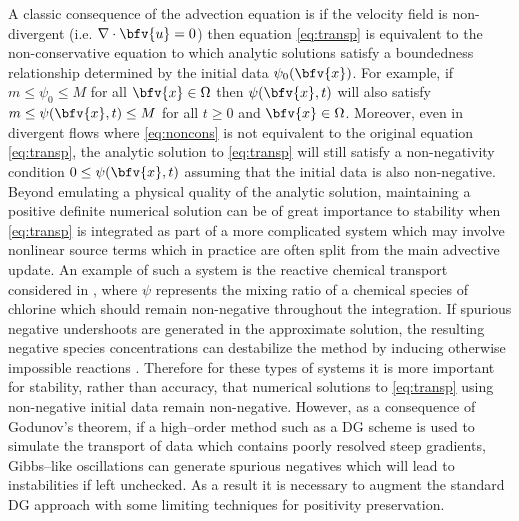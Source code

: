 \documentclass{ametsoc}
\begin{document}
A classic consequence of the advection equation is if the velocity field is non-divergent (i.e. $\nabla \cdot \bfv{u} = 0$) then equation \eqref{eq:transp} is equivalent to the non-conservative equation
to which analytic solutions satisfy a boundedness relationship determined by the initial data $\psi_0(\bfv{x})$. For example, if $m \leq \psi_0 \leq M$ for all $\bfv{x} \in \Omega$ then $\psi(\bfv{x},t)$ will also satisfy $m \leq \psi(\bfv{x},t) \leq M$ for all $t \geq 0$ and $\bfv{x} \in \Omega$.  Moreover, even in divergent flows where \eqref{eq:noncons} is not equivalent to the original equation \eqref{eq:transp}, the analytic solution to \eqref{eq:transp} will still satisfy a non-negativity condition $0 \leq \psi(\bfv{x},t)$ assuming that the initial data is also non-negative. Beyond emulating a physical quality of the analytic solution, maintaining a positive definite numerical solution can be of great importance to stability when \eqref{eq:transp} is integrated as part of a more complicated system which may involve nonlinear source terms which in practice are often split from the main advective update. An example of such a system is the reactive chemical transport considered in \cite{Lauritzen:2015aa}, where $\psi$ represents the mixing ratio of a chemical species of chlorine which should remain non-negative throughout the integration. If spurious negative undershoots are generated in the approximate solution, the resulting negative species concentrations can destabilize the method by inducing otherwise impossible reactions \cite{durran2010numerical}. Therefore for these types of systems it is more important for stability, rather than accuracy, that numerical solutions to \eqref{eq:transp} using non-negative initial data remain non-negative. However, as a consequence of Godunov's theorem, if a high--order method such as a DG scheme is used to simulate the transport of data which contains poorly resolved steep gradients, Gibbs--like oscillations can generate spurious negatives which will lead to instabilities if left unchecked. As a result it is necessary to augment the standard DG approach with some limiting techniques for positivity preservation.
\end{document}
